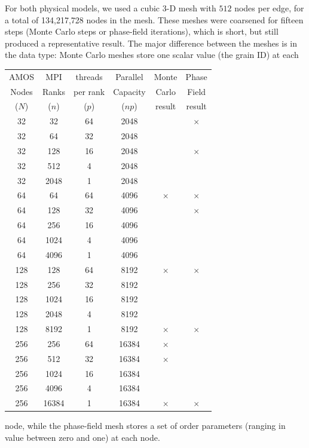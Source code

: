 \documentclass[11pt]{article}
\begin{document}
\begin{multicols*}{2}
For both physical models, we used a cubic 3-D mesh with $512$ nodes per edge, for a total of 134,217,728 nodes in the mesh.
These meshes were coarsened for fifteen steps (Monte Carlo steps or phase-field iterations), which is short, but still produced a representative result.
The major difference between the meshes is in the data type:
Monte Carlo meshes store one scalar value (the grain ID) at each
\begin{center}
\begin{minipage}{0.45\textwidth}\centering
{}
\begin{footnotesize}
\bgroup
\renewcommand\tabcolsep{5pt}
\begin{tabular}{|cccc|cc|}\hline
AMOS  	& MPI 	& threads & Parallel	& Monte	& Phase\\
Nodes	& Ranks & per rank & Capacity	& Carlo	& Field\\
($N$)	& ($n$)	& ($p$)	& ($np$)	& result & result\\\hline
32	& 32	& 64	& 2048	&\checkmark &$\times$ \\
32	& 64	& 32	& 2048	&\checkmark &\checkmark \\
32	& 128	& 16	& 2048	&\checkmark &$\times$ \\
32	& 512	& 4	& 2048	&\checkmark &\checkmark \\
32	& 2048	& 1	& 2048	&\checkmark &\checkmark \\\hline
64	& 64	& 64	& 4096	&$\times$ &$\times$ \\
64	& 128	& 32	& 4096	&\checkmark &$\times$ \\
64	& 256	& 16	& 4096	&\checkmark &\checkmark \\
64	& 1024	& 4	& 4096	&\checkmark &\checkmark \\
64	& 4096	& 1	& 4096	&\checkmark &\checkmark \\\hline
128	& 128	& 64	& 8192	&$\times$ &$\times$ \\
128	& 256	& 32	& 8192	&\checkmark &\checkmark \\
128	& 1024	& 16	& 8192	&\checkmark &\checkmark \\
128	& 2048	& 4	& 8192	&\checkmark &\checkmark \\
128	& 8192	& 1	& 8192	&$\times$ &$\times$ \\\hline
256	& 256	& 64	& 16384	&$\times$ &\checkmark \\
256	& 512	& 32	& 16384	&$\times$ &\checkmark \\
256	& 1024	& 16	& 16384	&\checkmark &\checkmark \\
256	& 4096	& 4	& 16384	&\checkmark &\checkmark \\
256	& 16384	& 1	& 16384	&$\times$ &$\times$ \\\hline
\end{tabular}
\egroup
\end{footnotesize}
\end{minipage}
\end{center}
node, while the phase-field mesh stores a set of order parameters (ranging in value between zero and one) at each node.


\end{multicols*}
\end{document}
